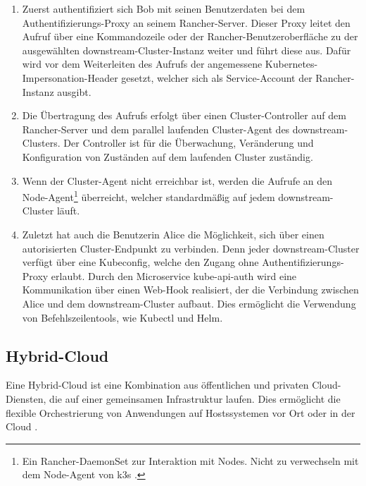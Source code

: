 \begin{enumerate}
\item Zuerst authentifiziert sich Bob mit seinen Benutzerdaten bei dem Authentifizie\-rungs-Proxy an seinem Rancher-Server.
Dieser Proxy leitet den Aufruf über eine Kommandozeile oder der Rancher-Benutzeroberfläche zu der ausgewählten downstream-Cluster-Instanz weiter und führt diese aus.
Dafür wird vor dem Weiterleiten des Aufrufs der angemessene Kubernetes-Impersonation-Header gesetzt, 
welcher sich als Service-Account der Rancher-Instanz ausgibt.   
\item Die Übertragung des Aufrufs erfolgt über einen Cluster-Controller auf dem Rancher-Server
und dem parallel laufenden Cluster-Agent des downstream-Clusters. Der Controller ist für die Überwachung, Veränderung
und Konfiguration von Zuständen auf dem laufenden Cluster zuständig. 
\item Wenn der Cluster-Agent nicht erreichbar ist,
werden die Aufrufe an den Node-Agent\footnote{Ein Rancher-DaemonSet zur Interaktion mit Nodes. 
Nicht zu verwechseln mit dem Node-Agent von k3s \cite{rancherAgents}. } überreicht, welcher standardmäßig auf jedem downstream-Cluster läuft.
\item Zuletzt hat auch die Benutzerin Alice die Möglichkeit, sich über einen autorisierten Cluster-Endpunkt zu verbinden.
Denn jeder downstream-Cluster verfügt über eine Kubeconfig, welche den Zugang ohne Authentifizierungs-Proxy erlaubt.
Durch den Microservice kube-api-auth wird eine Kommunikation über einen Web-Hook realisiert, der die Verbindung
zwischen Alice und dem downstream-Cluster aufbaut. 
Dies ermöglicht die Verwendung von Befehlszeilentools, wie Kubectl und Helm.
\end{enumerate}

\subsection{Hybrid-Cloud}
Eine Hybrid-Cloud ist eine Kombination aus öffentlichen und privaten Cloud-Diensten, die auf einer gemeinsamen Infrastruktur laufen.
Dies ermöglicht die flexible Orchestrierung von Anwendungen auf Hostssystemen vor Ort oder in der Cloud \cite{ibmHybrid}.

